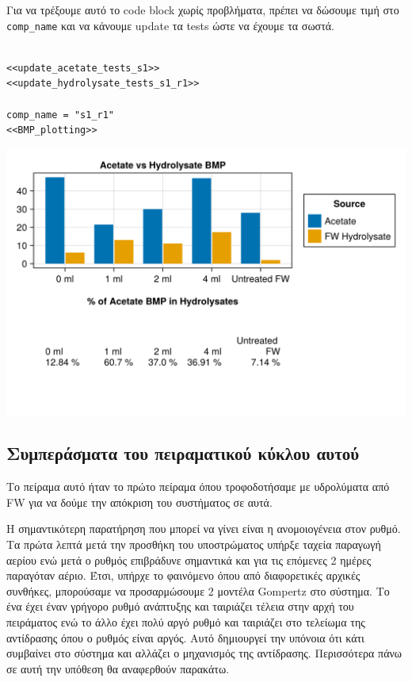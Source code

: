 \documentclass[11pt]{article}
\begin{document}
Για να τρέξουμε αυτό το code block χωρίς προβλήματα, πρέπει να δώσουμε τιμή στο \texttt{comp\_name} και να κάνουμε update τα tests ώστε να έχουμε τα σωστά.
\begin{verbatim}

<<update_acetate_tests_s1>>
<<update_hydrolysate_tests_s1_r1>>

comp_name = "s1_r1"
<<BMP_plotting>>
\end{verbatim}

\begin{center}
\includegraphics[width=.9\linewidth]{../plots/BMPs/Hydrolyzed FW/acet_vs_hydro_bmp_s1_r1.png}
\end{center}

\subsection{Συμπεράσματα του πειραματικού κύκλου αυτού}
\label{sec:orgbfd302b}
Το πείραμα αυτό ήταν το πρώτο πείραμα όπου τροφοδοτήσαμε με υδρολύματα από FW για να δούμε την απόκριση του συστήματος σε αυτά.

Η σημαντικότερη παρατήρηση που μπορεί να γίνει είναι η ανομοιογένεια στον ρυθμό. Τα πρώτα λεπτά μετά την προσθήκη του υποστρώματος υπήρξε ταχεία παραγωγή αερίου ενώ μετά ο ρυθμός επιβράδυνε σημαντικά και για τις επόμενες 2 ημέρες παραγόταν αέριο. Έτσι, υπήρχε το φαινόμενο όπου από διαφορετικές αρχικές συνθήκες, μπορούσαμε να προσαρμώσουμε 2 μοντέλα Gompertz στο σύστημα. Το ένα έχει έναν γρήγορο ρυθμό ανάπτυξης και ταιριάζει τέλεια στην αρχή του πειράματος ενώ το άλλο έχει πολύ αργό ρυθμό και ταιριάζει στο τελείωμα της αντίδρασης όπου ο ρυθμός είναι αργός. Αυτό δημιουργεί την υπόνοια ότι κάτι συμβαίνει στο σύστημα και αλλάζει ο μηχανισμός της αντίδρασης. Περισσότερα πάνω σε αυτή την υπόθεση θα αναφερθούν παρακάτω.
\end{document}
